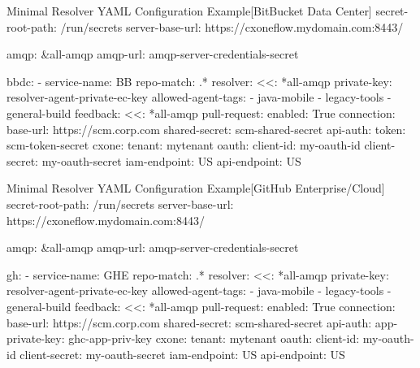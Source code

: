 
\begin{code}{Minimal Resolver YAML Configuration Example}{[BitBucket Data Center]}{}
  secret-root-path: /run/secrets
  server-base-url: https://cxoneflow.mydomain.com:8443/

  amqp: &all-amqp
    amqp-url: amqp-server-credentials-secret

  bbdc:
      - service-name: BB
        repo-match: .*
        resolver:
          <<: *all-amqp
          private-key: resolver-agent-private-ec-key
          allowed-agent-tags:
            - java-mobile
            - legacy-tools
            - general-build
        feedback:
          <<: *all-amqp
          pull-request:
            enabled: True
        connection:
          base-url: https://scm.corp.com
          shared-secret: scm-shared-secret
          api-auth:
            token: scm-token-secret
        cxone:
          tenant: mytenant
          oauth:
            client-id: my-oauth-id
            client-secret: my-oauth-secret
          iam-endpoint: US
          api-endpoint: US
\end{code}
  


\begin{code}{Minimal Resolver YAML Configuration Example}{[GitHub Enterprise/Cloud]}{}
  secret-root-path: /run/secrets
  server-base-url: https://cxoneflow.mydomain.com:8443/

  amqp: &all-amqp
    amqp-url: amqp-server-credentials-secret

  gh:
      - service-name: GHE
        repo-match: .*
        resolver:
          <<: *all-amqp
          private-key: resolver-agent-private-ec-key
          allowed-agent-tags:
            - java-mobile
            - legacy-tools
            - general-build
        feedback:
          <<: *all-amqp
          pull-request:
            enabled: True
        connection:
          base-url: https://scm.corp.com
          shared-secret: scm-shared-secret
          api-auth:
            app-private-key: ghc-app-priv-key
        cxone:
          tenant: mytenant
          oauth:
            client-id: my-oauth-id
            client-secret: my-oauth-secret
          iam-endpoint: US
          api-endpoint: US
\end{code}


